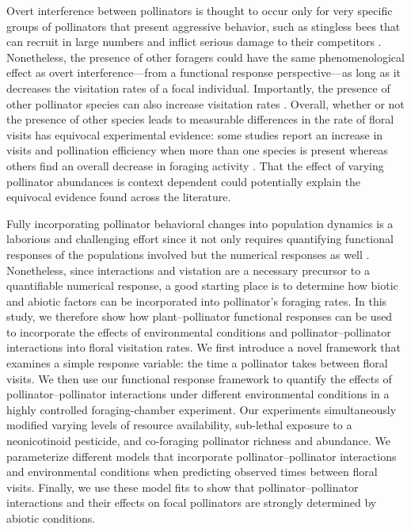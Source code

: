 \begin{refsection}
Overt interference between pollinators is thought to occur only for very specific groups of pollinators that present aggressive behavior, such as stingless bees that can recruit in large numbers and inflict serious damage to their competitors \citep{lichtenberg_olfactory_2011}. Nonetheless, the presence of other foragers could have the same phenomenological effect as overt interference---from a functional response perspective---as long as it decreases the visitation rates of a focal individual. Importantly, the presence of other pollinator species can also increase visitation rates \citep[e.g.][]{greenleaf_wild_2006}. Overall, whether or not the presence of other species leads to measurable differences in the rate of floral visits has equivocal experimental evidence: some studies report an increase in visits and pollination efficiency when more than one species is present \citep{frund_bee_2013} whereas others find an overall decrease in foraging activity \citep{roubik_competitive_1978, thomson_detecting_2006, thomson_importance_2020}. That the effect of varying pollinator abundances is context dependent could potentially explain the equivocal evidence found across the literature.


Fully incorporating pollinator behavioral changes into population dynamics is a laborious and challenging effort since it not only requires quantifying functional responses of the populations involved but the numerical responses as well \citep{revilla2015numerical, abrams_nature_2000}. Nonetheless, since interactions and vistation are a necessary precursor to a quantifiable numerical response, a good starting place is to determine how biotic and abiotic factors can be incorporated into pollinator's foraging rates. In this study, we therefore show how plant--pollinator functional responses can be used to incorporate the effects of environmental conditions and pollinator--pollinator interactions into floral visitation rates. We first introduce a novel framework that examines a simple response variable: the time a pollinator takes between floral visits. We then use our functional response framework to quantify the effects of pollinator--pollinator interactions under different environmental conditions in a highly controlled foraging-chamber experiment. Our experiments simultaneously modified varying levels of resource availability, sub-lethal exposure to a neonicotinoid pesticide, and co-foraging pollinator richness and abundance. We parameterize different models that incorporate pollinator--pollinator interactions and environmental conditions when predicting observed times between floral visits. Finally, we use these model fits to show that pollinator--pollinator interactions and their effects on focal pollinators are strongly determined by abiotic conditions.

\end{refsection}
